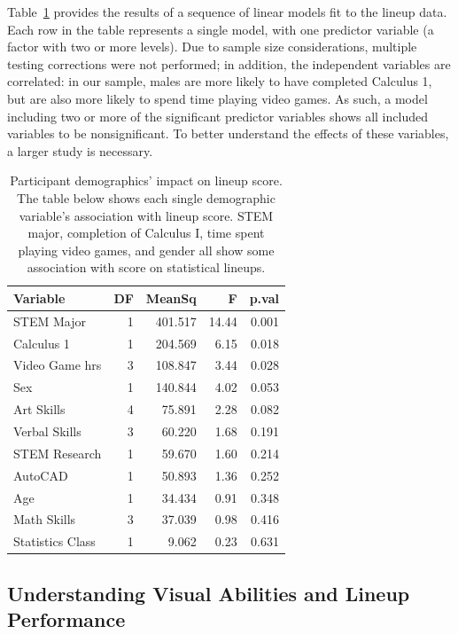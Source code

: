 \documentclass[11pt]{isuthesis}\usepackage[]{graphicx}\usepackage[]{color}
\begin{document}
Table~\ref{tab:ttest-demographics} provides the results of a sequence of linear models fit to the lineup data. Each row in the table represents a single model, with one predictor variable (a factor with two or more levels). Due to sample size considerations, multiple testing corrections were not performed; in addition, the independent variables are correlated: in our sample, males are more likely to have completed Calculus 1, but are also more likely to spend time playing video games. As such, a model including two or more of the significant predictor variables shows all included variables to be nonsignificant. To better understand the effects of these variables, a larger study is necessary. 
\begin{table}[ht]
\centering
\caption[Participant demographics and lineup scores]{Participant demographics' impact on lineup score. The table below shows each single demographic variable's association with lineup score. STEM major, completion of Calculus I, time spent playing video games, and gender all show some association with score on statistical lineups. \label{tab:ttest-demographics}} 
\begin{tabular}{lrrrr}
  \hline
Variable & DF & MeanSq & F & p.val \\ 
  \hline
STEM Major & 1 & 401.517 & 14.44 & 0.001 \\ 
  Calculus 1 & 1 & 204.569 & 6.15 & 0.018 \\ 
  Video Game hrs & 3 & 108.847 & 3.44 & 0.028 \\ 
  Sex & 1 & 140.844 & 4.02 & 0.053 \\ 
  Art Skills & 4 & 75.891 & 2.28 & 0.082 \\ 
  Verbal Skills & 3 & 60.220 & 1.68 & 0.191 \\ 
  STEM Research & 1 & 59.670 & 1.60 & 0.214 \\ 
  AutoCAD & 1 & 50.893 & 1.36 & 0.252 \\ 
  Age & 1 & 34.434 & 0.91 & 0.348 \\ 
  Math Skills & 3 & 37.039 & 0.98 & 0.416 \\ 
  Statistics Class & 1 & 9.062 & 0.23 & 0.631 \\ 
   \hline
\end{tabular}
\end{table}



\subsection{Understanding Visual Abilities and Lineup Performance}
\end{document}
